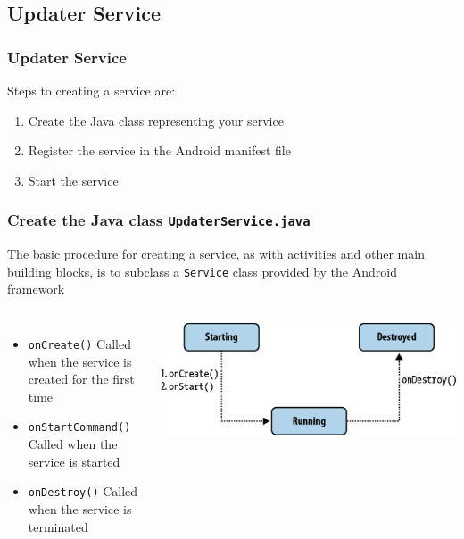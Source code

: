 \subsection{Updater Service}
\begin{frame}
\frametitle{Updater Service}
Steps to creating a service are:
\begin{enumerate}
\item Create the Java class representing your service
\item Register the service in the Android manifest file
\item Start the service
\end{enumerate}
\end{frame}
\begin{frame}
\frametitle{Create the Java class \texttt{UpdaterService.java}}
The basic procedure for creating a service, as with activities and other main building
blocks, is to subclass a \texttt{Service} class provided by the Android framework
\begin{columns}
\begin{itemize}
\item \texttt{onCreate()} Called when the service is created for the first time
\item \texttt{onStartCommand()} Called when the service is started
\item \texttt{onDestroy()} Called when the service is terminated
\end{itemize}
\includegraphics[width= 1.10 \textwidth]{fig-078.eps}
\end{columns}
\end{frame}
